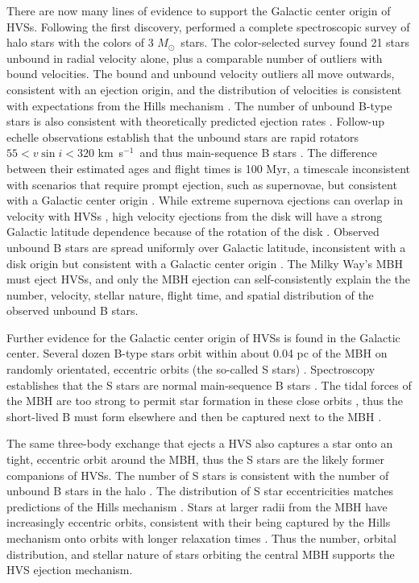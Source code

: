 \documentclass[iop]{emulateapj}
\newcommand{\kms}{\hbox{km~s$^{-1}$}}
\newcommand{\msun}{$M_{\odot}$}
\begin{document}
There are now many lines of evidence to support the Galactic center origin 
of HVSs.  Following the first discovery, \citet{brown07b, brown14} performed a 
complete spectroscopic survey of halo stars with the colors of 3 \msun\ stars.  The 
color-selected survey found 21 stars unbound in radial velocity alone, plus a 
comparable number of outliers with bound velocities.  The bound and unbound velocity 
outliers all move outwards, consistent with an ejection origin, and the distribution 
of velocities is consistent with expectations from the Hills mechanism 
\citep{kenyon08, kenyon14}.  The number of unbound B-type stars is also consistent 
with theoretically predicted ejection rates \citep{hills88, zhang10, zhang13}.  
Follow-up echelle observations establish that the unbound stars are rapid rotators 
$55 < v\sin{i} < 320$ \kms\ and thus main-sequence B stars \citep{przybilla08b, 
lopezmorales08, brown12c, brown13b}.  The difference between their estimated ages 
and flight times is 100 Myr, a timescale inconsistent with scenarios that require 
prompt ejection, such as supernovae, but consistent with a Galactic center origin 
\citep{brown12c}.  While extreme supernova ejections can overlap in velocity with 
HVSs \citep{heber08}, high velocity ejections from the disk will have a strong 
Galactic latitude dependence because of the rotation of the disk \citep{bromley09}.  
Observed unbound B stars are spread uniformly over Galactic latitude, inconsistent 
with a disk origin but consistent with a Galactic center origin \citep{brown12b}.  
The Milky Way's MBH must eject HVSs, and only the MBH ejection can self-consistently 
explain the the number, velocity, stellar nature, flight time, and spatial 
distribution of the observed unbound B stars.

Further evidence for the Galactic center origin of HVSs is found in the 
Galactic center.  Several dozen B-type stars orbit within about 0.04 pc of the MBH 
on randomly orientated, eccentric orbits (the so-called S stars) \citep{ghez08, 
gillessen09}.  Spectroscopy establishes that the S stars are normal main-sequence B 
stars \citep{ghez03, eisenhauer05}.  The tidal forces of the MBH are too strong to 
permit star formation in these close orbits \citep{morris93}, thus the short-lived B 
must form elsewhere and then be captured next to the MBH \citep{gould03}.

The same three-body exchange that ejects a HVS also captures a star onto an 
tight, eccentric orbit around the MBH, thus the S stars are the likely former 
companions of HVSs.  The number of S stars is consistent with the number of unbound 
B stars in the halo \citep{bromley12, kenyon14}.  The distribution of S star 
eccentricities matches predictions of the Hills mechanism \citep{perets09c, zhang13, 
madigan14}.  Stars at larger radii from the MBH have increasingly eccentric orbits, 
consistent with their being captured by the Hills mechanism onto orbits with longer 
relaxation times \citep{madigan14}.  Thus the number, orbital distribution, and 
stellar nature of stars orbiting the central MBH supports the HVS ejection 
mechanism.
\end{document}
